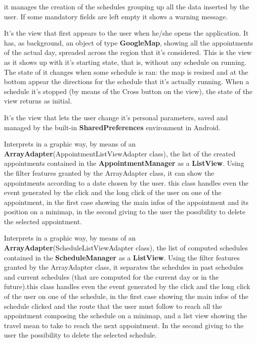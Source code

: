 it manages the creation of the schedules grouping up all the data inserted by the user. If some mandatory fields are left empty it shows a warning message.

It's the view that first appears to the user when he/she opens the application. It has, as background, an object of type \textbf{GoogleMap}, showing all the appointments of the actual day, spreaded across the region that it's considered. This is the view as it shows up with it's starting state, that is, without any schedule on running. The state of it changes when some schedule is ran: the map is resized and at the bottom appear the directions for the schedule that it's actually running. When a schedule it's stopped (by means of the Cross button on the view), the state of the view returns as initial.

It's the view that lets the user change it's personal parameters, saved and managed by the built-in \textbf{SharedPreferences} environment in Android.

Interprets in a graphic way, by means of an \textbf{ArrayAdapter}(AppointmentListViewAdapter class), the list of the created appointments contained in the \textbf{AppointmentManager} as a \textbf{ListView}. Using the filter features granted by the ArrayAdapter class, it can show the appointments according to a date chosen by the user. this class handles even the event generated by the click and the long click of the user on one of the appointment, in the first case showing the  main infos of the appointment and its position on a minimap, in the second giving to the user the possibility to delete the selected appointment.  

Interprets in a graphic way, by means of an \textbf{ArrayAdapter}(ScheduleListViewAdapter class), the list of computed schedules contained in the \textbf{ScheduleManager} as a \textbf{ListView}. Using the filter features granted by the ArrayAdapter class, it separates the schedules in past schedules and current schedules (that are computed for the current day or in the future).this class handles even the event generated by the click and the long click of the user on one of the schedule, in the first case showing the  main infos of the schedule clicked and the route that the user must follow to reach all the appointment composing the schedule on a minimap, and a list view showing the travel mean to take to reach the next appointment. In the second giving to the user the possibility to delete the selected schedule.  
 
